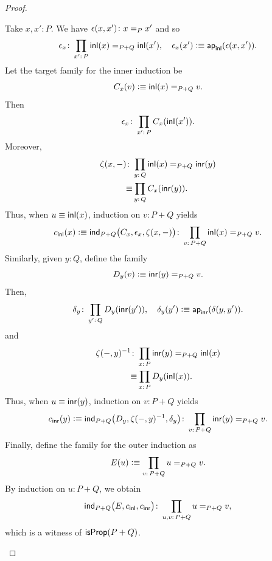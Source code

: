 \begin{proof}
\begin{enumerate}[a)]
        Take $x,x'\colon P$. We have $\epsilon(x,x')\colon x\eq{P}x'$ and so
        \[
            \epsilon_x\colon\prod_{x'\colon P}
                \fun{inl}(x)\eq{P+Q}\fun{inl}(x'),
                \quad\epsilon_x(x')\defeq\fun{ap}_{\fun{inl}}(\epsilon(x,x')).
        \]
        Let the target family for the inner induction be
        \[
            C_x(v)\mathrel{\vcentcolon}\equiv\mathsf{inl}(x)\mathrel{=_{P+Q}}v.
        \]
        Then
        \[
            \epsilon_x\colon\prod_{x'\colon P}C_x(\fun{inl}(x')).
        \]
        Moreover,
        \begin{align*}
            \zeta(x,\dummy)\colon&\prod_{y\colon Q}
                \fun{inl}(x)\eq{P+Q}\fun{inr}(y)\\
                \equiv&\prod_{y\colon Q}C_x(\fun{inr}(y)).
        \end{align*}
        Thus, when $u\equiv\mathsf{inl}(x)$, induction on $v\colon P+Q$ yields
        \[
            c_{\fun{inl}}(x)\defeq\fun{ind}_{P+Q}
            \bigl(
                C_x,
                \epsilon_x,
                \zeta(x,\dummy)
            \bigr)\colon\prod_{v\colon P+Q} \fun{inl}(x)\eq{P+Q}v.
        \]
        Similarly, given $y\colon Q$, define the family
        \[
            D_y(v)\mathrel{\vcentcolon}\equiv\mathsf{inr}(y)\mathrel{=_{P+Q}}v.
        \]
        Then,
        \begin{align*}
            \delta_y\colon\prod_{y'\colon Q}D_y(\fun{inr}(y')),
            \quad\delta_y(y')\defeq\fun{ap}_{\fun{inr}}(\delta(y,y')).
        \end{align*}
        and
        \begin{align*}
            \zeta(\dummy,y)^{-1}\colon&\prod_{x\colon P}
                \fun{inr}(y)\eq{P+Q}\fun{inl}(x)\\
                \equiv&\prod_{x\colon P}D_y(\fun{inl}(x)).
        \end{align*}
        Thus, when $u\equiv\mathsf{inr}(y)$, induction on $v\colon P+Q$ yields
        \[
            c_{\fun{inr}}(y)\defeq\fun{ind}_{P+Q}
            \bigl(
                D_y,
                \zeta(\dummy,y)^{-1},
                \delta_y
            \bigr)\colon\prod_{v\colon P+Q} \fun{inr}(y)\eq{P+Q}v.
        \]
        Finally, define the family for the outer induction as
        \[
            E(u)\defeq\prod_{v\colon P+Q}u\eq{P+Q}v.
        \]
        By induction on $u\colon P+Q$, we obtain
        \[
            \fun{ind}_{P+Q}
            \bigl(
                E,
                c_{\fun{inl}},
                c_{\fun{inr}}
            \bigr)\colon\prod_{u,v\colon P+Q}u\eq{P+Q}v,
        \]
        which is a witness of $\mathsf{isProp}(P+Q)$.


\end{enumerate}
\end{proof}
